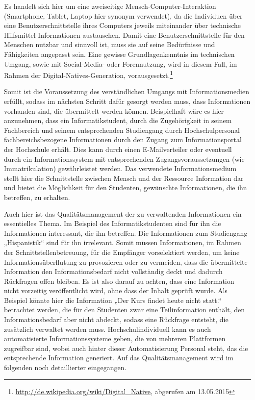 Es handelt sich hier um eine zweiseitige Mensch-Computer-Interaktion (Smartphone, Tablet, Laptop hier synonym verwendet), da die Individuen über eine Benutzerschnittstelle ihres Computers jeweils miteinander über technische Hilfsmittel Informationen austauschen.
Damit eine Benutzerschnittstelle für den Menschen nutzbar und sinnvoll ist, muss sie auf seine Bedürfnisse und Fähigkeiten angepasst sein. 
Eine gewisse Grundlagenkenntnis im technischen Umgang, sowie mit Social-Media- oder Forennutzung, wird in diesem Fall, im Rahmen der Digital-Natives-Generation, vorausgesetzt.\footnote{\url{http://de.wikipedia.org/wiki/Digital_Native}, abgerufen am 13.05.2015}

Somit ist die Voraussetzung des verständlichen Umgangs mit Informationsmedien erfüllt, sodass im nächsten Schritt dafür gesorgt werden muss, dass Informationen vorhanden sind, die übermittelt werden können. 
Beispielhaft wäre es hier anzunehmen, dass ein Informatikstudent, durch die Zugehörigkeit in seinem Fachbereich und seinem entsprechenden Studiengang durch Hochschulpersonal fachbereichsbezogene Informationen durch den Zugang zum Informationsportal der Hochschule erhält. 
Dies kann durch einen E-Mailverteiler oder eventuell durch ein Informationssystem mit entsprechenden Zugangsvoraussetzungen (wie Immatrikulation) gewährleistet werden. 
Das verwendete Informationsmedium stellt hier die Schnittstelle zwischen Mensch und der Ressource Information dar und bietet die Möglichkeit für den Studenten, gewünschte Informationen, die ihn betreffen, zu erhalten.

Auch hier ist das Qualitätsmanagement der zu verwaltenden Informationen ein essentielles Thema. 
Im Beispiel des Informatikstudenten sind für ihn die Informationen interessant, die ihn betreffen. 
Die Informationen zum Studiengang „Hispanistik“ sind für ihn irrelevant. 
Somit müssen Informationen, im Rahmen der Schnittstellenbetreuung, für die Empfänger vorselektiert werden, um keine Informationsüberflutung zu provozieren oder zu vermeiden, dass die übermittelte Information den Informationsbedarf nicht vollständig deckt und dadurch Rückfragen offen bleiben. 
Es ist also darauf zu achten, dass eine Information nicht vorzeitig veröffentlicht wird, ohne dass der Inhalt geprüft wurde. 
Als Beispiel könnte hier die Information „Der Kurs findet heute nicht statt.“ betrachtet werden, die für den Studenten zwar eine Teilinformation enthält, den Informationsbedarf aber nicht abdeckt, sodass eine Rückfrage entsteht, die zusätzlich verwaltet werden muss. 
Hochschulindividuell kann es auch automatisierte Informationssysteme geben, die von mehreren Plattformen zugreifbar sind, wobei auch hinter dieser Automatisierung Personal steht, das die entsprechende Information generiert. 
Auf das Qualitätsmanagement wird im folgenden noch detaillierter eingegangen.

